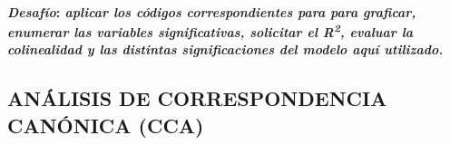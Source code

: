 \documentclass[
]{book}
\begin{document}
\hypertarget{desafuxedo-aplicar-los-cuxf3digos-correspondientes-para-para-graficar-enumerar-las-variables-significativas-solicitar-el-r2-evaluar-la-colinealidad-y-las-distintas-significaciones-del-modelo-aquuxed-utilizado.}{%
\paragraph{\texorpdfstring{\textbf{\emph{Desafío}}: \emph{aplicar los códigos correspondientes para para graficar, enumerar las variables significativas, solicitar el R\textsuperscript{2}, evaluar la colinealidad y las distintas significaciones del modelo aquí utilizado.}}{Desafío: aplicar los códigos correspondientes para para graficar, enumerar las variables significativas, solicitar el R2, evaluar la colinealidad y las distintas significaciones del modelo aquí utilizado.}}\label{desafuxedo-aplicar-los-cuxf3digos-correspondientes-para-para-graficar-enumerar-las-variables-significativas-solicitar-el-r2-evaluar-la-colinealidad-y-las-distintas-significaciones-del-modelo-aquuxed-utilizado.}}

\hypertarget{anuxe1lisis-de-correspondencia-canuxf3nica-cca}{%
\subsection{\texorpdfstring{\textbf{ANÁLISIS DE CORRESPONDENCIA CANÓNICA (CCA)}}{ANÁLISIS DE CORRESPONDENCIA CANÓNICA (CCA)}}\label{anuxe1lisis-de-correspondencia-canuxf3nica-cca}}
\end{document}
